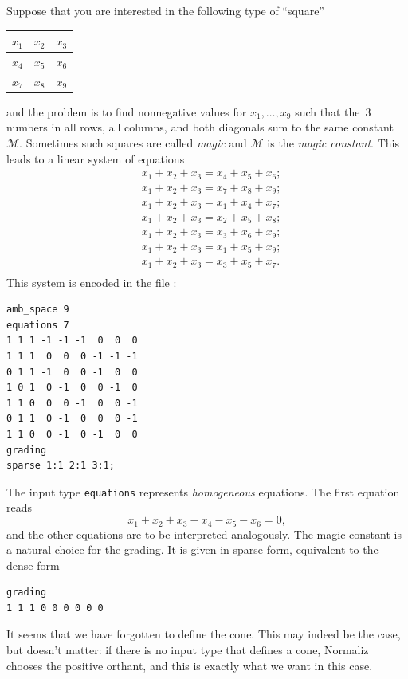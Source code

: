 Suppose that you are interested in the following type of ``square''
\begin{center}
	\begin{tabular}{|l|l|l|}
		\hline
		$x_1$ & $x_2$ & $x_3$\\
		\hline
		$x_4$ & $x_5$ & $x_6$\\
		\hline
		$x_7$ & $x_8$ & $x_9$\\
		\hline
	\end{tabular}
\end{center}
and the problem is to find nonnegative values for $x_1,\dots,x_9$
such that the~$3$ numbers in all rows, all columns, and both
diagonals sum to the same constant $\mathcal{M}$. Sometimes
such squares are called \emph{magic} and $\mathcal M$ is the
\emph{magic constant}. This leads to a linear system of
equations
\begin{align*}
& x_1+x_2+x_3=x_4+x_5+x_6;\\
& x_1+x_2+x_3=x_7+x_8+x_9;\\
& x_1+x_2+x_3=x_1+x_4+x_7;\\
& x_1+x_2+x_3=x_2+x_5+x_8;\\
& x_1+x_2+x_3=x_3+x_6+x_9;\\
& x_1+x_2+x_3=x_1+x_5+x_9;\\
& x_1+x_2+x_3=x_3+x_5+x_7.\\
\end{align*}
This system is encoded in the file
:
\begin{Verbatim}
amb_space 9
equations 7
1 1 1 -1 -1 -1  0  0  0
1 1 1  0  0  0 -1 -1 -1
0 1 1 -1  0  0 -1  0  0
1 0 1  0 -1  0  0 -1  0
1 1 0  0  0 -1  0  0 -1
0 1 1  0 -1  0  0  0 -1
1 1 0  0 -1  0 -1  0  0
grading
sparse 1:1 2:1 3:1;
\end{Verbatim}

The input type \verb|equations| represents \emph{homogeneous} equations. The first equation reads
$$
x_1+x_2+x_3-x_4-x_5-x_6=0,
$$
and the other equations are to be interpreted analogously. The magic constant is a natural choice for the grading. It is given in sparse form, equivalent to the dense form
\begin{Verbatim}
grading
1 1 1 0 0 0 0 0 0
\end{Verbatim}

It seems that we have forgotten to define the cone. This may indeed be the case, but doesn't matter: if there is no input type that defines a cone, Normaliz chooses the positive orthant, and this is exactly what we want in this case.

